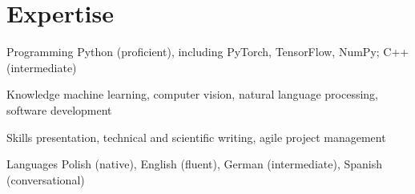 \documentclass[]{friggeri-cv_osx}
\begin{document}
\section{Expertise}
\begin{entrylist}
\entry
{}
{Programming}
{}
{Python (proficient), including PyTorch, TensorFlow, NumPy; C++ (intermediate)}

\entry
{}
{Knowledge}
{}
{machine learning, computer vision, natural language processing, software development}

\entry
{}
{Skills}
{}
{presentation, technical and scientific writing, agile project management}

\entry
{}
{Languages}
{}
{Polish (native), English (fluent), German (intermediate), Spanish (conversational)}
\end{entrylist}
\end{document}
